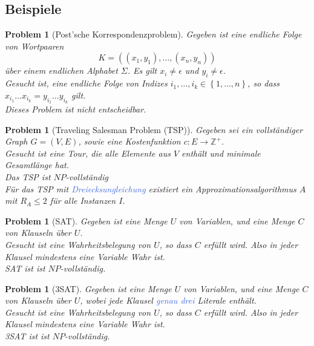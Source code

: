 \documentclass[11pt]{article}
\newcommand{\tcol}[1]{\textcolor{RoyalBlue}{#1}}
\newcommand{\set}[1]{\left\lbrace #1\right\rbrace}
\theoremstyle{break}
\newtheorem{prob}[satz]{Problem}
\begin{document}
    \subsection{Beispiele}
	\label{subsec:beispiele}

    \begin{prob}[Post'sche Korrespondenzproblem]
        Gegeben ist eine endliche Folge von Wortpaaren
        \[K=((x_1,y_1),\dots,(x_n,y_n))\]
        über einem endlichen Alphabet $\Sigma$.
        Es gilt $x_i\neq\epsilon$ und $y_i\neq\epsilon$.\\
        Gesucht ist, eine endliche Folge von Indizes $i_1,\dots,i_k\in\set{1,\dots,n}$, so dass $x_{i_1}\dots x_{i_k}=y_{i_1}\dots y_{i_k}$ gilt.\\
        Dieses Problem ist nicht entscheidbar.
    \end{prob}

    \begin{prob}[Traveling Salesman Problem (TSP)]
        Gegeben sei ein vollständiger Graph $G=(V,E)$, sowie eine Kostenfunktion $c\colon E\to\mathbb{Z}^+$.\\
        Gesucht ist eine Tour, die alle Elemente aus $V$ enthält und minimale Gesamtlänge hat.\\
        Das TSP ist $NP$-vollständig\\
        Für das TSP mit \tcol{Dreiecksungleichung} existiert ein Approximationsalgorithmus $A$ mit $R_A\leq 2$ für alle Instanzen $I$.
    \end{prob}

    \begin{prob}[SAT]
        Gegeben ist eine Menge $U$ von Variablen, und eine Menge $C$ von Klauseln über $U$.\\
        Gesucht ist eine Wahrheitsbelegung von $U$, so dass $C$ erfüllt wird.
        Also in jeder Klausel mindestens eine Variable Wahr ist.\\
        SAT ist ist $NP$-vollständig.
    \end{prob}

    \begin{prob}[3SAT]
        Gegeben ist eine Menge $U$ von Variablen, und eine Menge $C$ von Klauseln über $U$, wobei jede Klausel \tcol{genau drei} Literale enthält.\\
        Gesucht ist eine Wahrheitsbelegung von $U$, so dass $C$ erfüllt wird.
        Also in jeder Klausel mindestens eine Variable Wahr ist.\\
        3SAT ist ist $NP$-vollständig.
    \end{prob}
\end{document}
